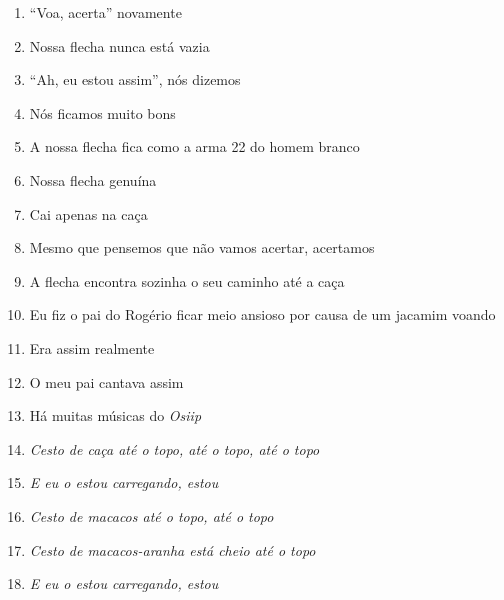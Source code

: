 \begin{enumerate}
 \item ``Voa, acerta'' novamente

 \item Nossa flecha nunca está vazia

 \begin{center}\end{center}

 \item ``Ah, eu estou assim'', nós dizemos

 \item Nós ficamos muito bons

 \item A nossa flecha fica como a arma 22 do homem branco

 \item Nossa flecha genuína

 \item Cai apenas na caça

 \item Mesmo que pensemos que não vamos acertar, acertamos

 \item A flecha encontra sozinha o seu caminho até a caça

 \item Eu fiz o pai do Rogério ficar meio ansioso por causa de um jacamim
 voando

 \item Era assim realmente

 \begin{center}\end{center}

 \item O meu pai cantava assim

 \item Há muitas músicas do \textit{Osiip}

 \item\textit{Cesto de caça até o topo, até o topo, até o topo}

 \item\textit{E eu o estou carregando, estou }

 \item\textit{Cesto de macacos até o topo, até o topo}

 \item\textit{Cesto de macacos-aranha está cheio até o topo}

 \item\textit{E eu o estou carregando, estou}


\end{enumerate}
